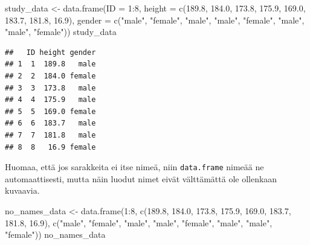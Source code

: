 \documentclass[
]{book}
\newenvironment{Shaded}{\begin{snugshade}}{\end{snugshade}}
\newcommand{\AttributeTok}[1]{\textcolor[rgb]{0.77,0.63,0.00}{#1}}
\newcommand{\DecValTok}[1]{\textcolor[rgb]{0.00,0.00,0.81}{#1}}
\newcommand{\FloatTok}[1]{\textcolor[rgb]{0.00,0.00,0.81}{#1}}
\newcommand{\FunctionTok}[1]{\textcolor[rgb]{0.00,0.00,0.00}{#1}}
\newcommand{\NormalTok}[1]{#1}
\newcommand{\OtherTok}[1]{\textcolor[rgb]{0.56,0.35,0.01}{#1}}
\newcommand{\SpecialCharTok}[1]{\textcolor[rgb]{0.00,0.00,0.00}{#1}}
\newcommand{\StringTok}[1]{\textcolor[rgb]{0.31,0.60,0.02}{#1}}
\begin{document}
\begin{Shaded}
\begin{Highlighting}[]
\NormalTok{study\_data }\OtherTok{\textless{}{-}} \FunctionTok{data.frame}\NormalTok{(}\AttributeTok{ID =} \DecValTok{1}\SpecialCharTok{:}\DecValTok{8}\NormalTok{,}
                         \AttributeTok{height =} \FunctionTok{c}\NormalTok{(}\FloatTok{189.8}\NormalTok{, }\FloatTok{184.0}\NormalTok{, }\FloatTok{173.8}\NormalTok{, }\FloatTok{175.9}\NormalTok{, }\FloatTok{169.0}\NormalTok{, }\FloatTok{183.7}\NormalTok{, }\FloatTok{181.8}\NormalTok{, }\FloatTok{16.9}\NormalTok{),}
                         \AttributeTok{gender =} \FunctionTok{c}\NormalTok{(}\StringTok{"male"}\NormalTok{, }\StringTok{"female"}\NormalTok{, }\StringTok{"male"}\NormalTok{, }\StringTok{"male"}\NormalTok{, }\StringTok{"female"}\NormalTok{, }\StringTok{"male"}\NormalTok{, }\StringTok{"male"}\NormalTok{, }\StringTok{"female"}\NormalTok{))}
\NormalTok{study\_data}
\end{Highlighting}
\end{Shaded}

\begin{verbatim}
##   ID height gender
## 1  1  189.8   male
## 2  2  184.0 female
## 3  3  173.8   male
## 4  4  175.9   male
## 5  5  169.0 female
## 6  6  183.7   male
## 7  7  181.8   male
## 8  8   16.9 female
\end{verbatim}

Huomaa, että jos sarakkeita ei itse nimeä, niin \texttt{data.frame} nimeää ne automaattisesti, mutta näin luodut nimet eivät välttämättä ole ollenkaan kuvaavia.

\begin{Shaded}
\begin{Highlighting}[]
\NormalTok{no\_names\_data }\OtherTok{\textless{}{-}} \FunctionTok{data.frame}\NormalTok{(}\DecValTok{1}\SpecialCharTok{:}\DecValTok{8}\NormalTok{,}
                            \FunctionTok{c}\NormalTok{(}\FloatTok{189.8}\NormalTok{, }\FloatTok{184.0}\NormalTok{, }\FloatTok{173.8}\NormalTok{, }\FloatTok{175.9}\NormalTok{, }\FloatTok{169.0}\NormalTok{, }\FloatTok{183.7}\NormalTok{, }\FloatTok{181.8}\NormalTok{, }\FloatTok{16.9}\NormalTok{),}
                            \FunctionTok{c}\NormalTok{(}\StringTok{"male"}\NormalTok{, }\StringTok{"female"}\NormalTok{, }\StringTok{"male"}\NormalTok{, }\StringTok{"male"}\NormalTok{, }\StringTok{"female"}\NormalTok{, }\StringTok{"male"}\NormalTok{, }\StringTok{"male"}\NormalTok{, }\StringTok{"female"}\NormalTok{))}
\NormalTok{no\_names\_data}
\end{Highlighting}
\end{Shaded}
\end{document}

